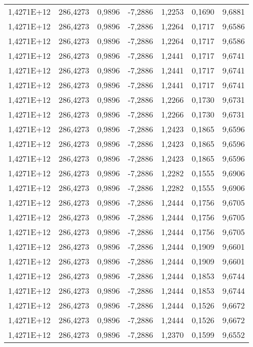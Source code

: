 \begin{table}[htbp]
\begin{tabular}{rrrrrrr}
    1,4271E+12 & 286,4273 & 0,9896 & -7,2886 & 1,2253 & 0,1690 & 9,6881 \\
    1,4271E+12 & 286,4273 & 0,9896 & -7,2886 & 1,2264 & 0,1717 & 9,6586 \\
    1,4271E+12 & 286,4273 & 0,9896 & -7,2886 & 1,2264 & 0,1717 & 9,6586 \\
    1,4271E+12 & 286,4273 & 0,9896 & -7,2886 & 1,2441 & 0,1717 & 9,6741 \\
    1,4271E+12 & 286,4273 & 0,9896 & -7,2886 & 1,2441 & 0,1717 & 9,6741 \\
    1,4271E+12 & 286,4273 & 0,9896 & -7,2886 & 1,2441 & 0,1717 & 9,6741 \\
    1,4271E+12 & 286,4273 & 0,9896 & -7,2886 & 1,2266 & 0,1730 & 9,6731 \\
    1,4271E+12 & 286,4273 & 0,9896 & -7,2886 & 1,2266 & 0,1730 & 9,6731 \\
    1,4271E+12 & 286,4273 & 0,9896 & -7,2886 & 1,2423 & 0,1865 & 9,6596 \\
    1,4271E+12 & 286,4273 & 0,9896 & -7,2886 & 1,2423 & 0,1865 & 9,6596 \\
    1,4271E+12 & 286,4273 & 0,9896 & -7,2886 & 1,2423 & 0,1865 & 9,6596 \\
    1,4271E+12 & 286,4273 & 0,9896 & -7,2886 & 1,2282 & 0,1555 & 9,6906 \\
    1,4271E+12 & 286,4273 & 0,9896 & -7,2886 & 1,2282 & 0,1555 & 9,6906 \\
    1,4271E+12 & 286,4273 & 0,9896 & -7,2886 & 1,2444 & 0,1756 & 9,6705 \\
    1,4271E+12 & 286,4273 & 0,9896 & -7,2886 & 1,2444 & 0,1756 & 9,6705 \\
    1,4271E+12 & 286,4273 & 0,9896 & -7,2886 & 1,2444 & 0,1756 & 9,6705 \\
    1,4271E+12 & 286,4273 & 0,9896 & -7,2886 & 1,2444 & 0,1909 & 9,6601 \\
    1,4271E+12 & 286,4273 & 0,9896 & -7,2886 & 1,2444 & 0,1909 & 9,6601 \\
    1,4271E+12 & 286,4273 & 0,9896 & -7,2886 & 1,2444 & 0,1853 & 9,6744 \\
    1,4271E+12 & 286,4273 & 0,9896 & -7,2886 & 1,2444 & 0,1853 & 9,6744 \\
    1,4271E+12 & 286,4273 & 0,9896 & -7,2886 & 1,2444 & 0,1526 & 9,6672 \\
    1,4271E+12 & 286,4273 & 0,9896 & -7,2886 & 1,2444 & 0,1526 & 9,6672 \\
    1,4271E+12 & 286,4273 & 0,9896 & -7,2886 & 1,2370 & 0,1599 & 9,6552 \\

\end{tabular}
\end{table}

